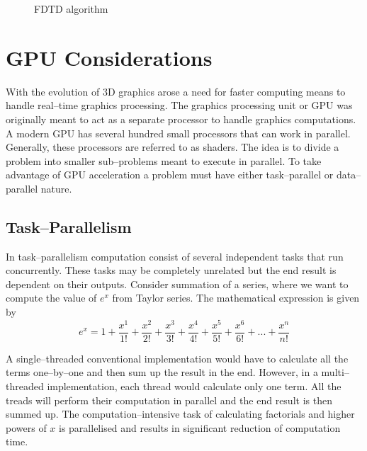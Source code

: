 \documentclass{article}
\begin{document}
\begin{figure}[htbp]
\caption{FDTD algorithm}
\label{1D-DNG-Algorithm}
\end{figure}
\section{GPU Considerations}
With the evolution of 3D graphics arose a need for faster computing means to handle real--time graphics processing. The graphics processing unit or GPU was originally meant to act as a separate processor to handle graphics computations. A modern GPU has several hundred small processors that can work in parallel. Generally, these processors are referred to as shaders. The idea is to divide a problem into smaller sub--problems meant to execute in parallel. To take advantage of GPU acceleration a problem must have either task--parallel or data--parallel nature.
\subsection{Task--Parallelism}
In task--parallelism computation consist of several independent tasks that run concurrently. These tasks may be completely unrelated but the end result is dependent on their outputs. Consider summation of a series, where we want to compute the value of $e^x$ from Taylor series. The mathematical expression is given by
\begin{equation}
e^x = 1+\dfrac{x^1}{1!}+\dfrac{x^2}{2!}+\dfrac{x^3}{3!}+\dfrac{x^4}{4!}+\dfrac{x^5}{5!}+\dfrac{x^6}{6!}+...+\dfrac{x^n}{n!}
\label{eq:ex-Taylor-Series}
\end{equation}

A single--threaded conventional implementation would have to calculate all the terms one--by--one and then sum up the result in the end. However, in a multi--threaded implementation, each thread would calculate only one term. All the treads will perform their computation in parallel and the end result is then summed up. The computation--intensive task of calculating factorials and higher powers of $x$ is parallelised and results in significant reduction of computation time.
\end{document}
